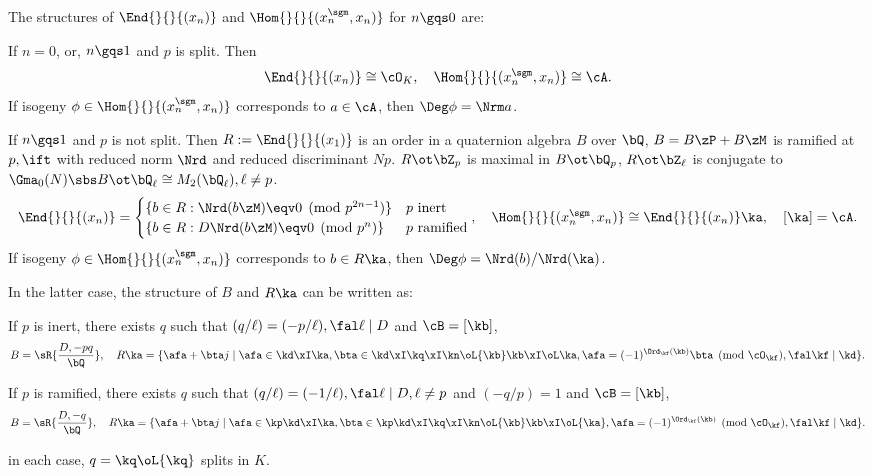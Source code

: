 \documentclass[article, a4paper, twoside]{universal}
\begin{document}
\begin{thm}\label{thm:structure}
	The structures of $\End{}{}{(x_{n})}$ and $\Hom{}{}{(x_{n}^{\sgm},x_{n})}$ for $n\gqs0$ are:
	\begin{itm}
		\item If $n=0$, or, $n\gqs1$ and $p$ is split. Then
		\[
			\End{}{}{(x_{n})}\cong\cO_{K},\quad \Hom{}{}{(x_{n}^{\sgm},x_{n})}\cong\cA.
		\]
		If isogeny $\phi\in\Hom{}{}{(x_{n}^{\sgm},x_{n})}$ corresponds to $a\in\cA$, then $\Deg\phi=\Nrm a$.
		\item If $n\gqs1$ and $p$ is not split. Then $R:=\End{}{}{(x_{1})}$ is an order in a quaternion algebra $B$ over $\bQ$, $B=B\zP+B\zM$ is ramified at $p,\ift$ with reduced norm $\Nrd$ and reduced discriminant $Np$. $R\ot\bZ_{p}$ is maximal in $B\ot\bQ_{p}$, $R\ot\bZ_{\ell}$ is conjugate to $\Gma_{0}(N)\sbs B\ot\bQ_{\ell}\cong M_{2}(\bQ_{\ell}),\ell\neq p$.
		\[
			\End{}{}{(x_{n})}=\begin{cases}
						\{b\in R:\Nrd(b\zM)\eqv0\pmod{p^{2n-1}}\} & \text{$p$ inert} \\
						\{b\in R:D\Nrd(b\zM)\eqv0\pmod{p^{n}}\} & \text{$p$ ramified} \\
						\end{cases},\quad \Hom{}{}{(x_{n}^{\sgm},x_{n})}\cong\End{}{}{(x_{n})}\ka,\quad [\ka]=\cA.
		\]
		If isogeny $\phi\in\Hom{}{}{(x_{n}^{\sgm},x_{n})}$ corresponds to $b\in R\ka$, then $\Deg\phi=\Nrd(b)/\Nrd(\ka)$.
	\end{itm}

	In the latter case, the structure of $B$ and $R\ka$ can be written as:
	\begin{itm}
		\item If $p$ is inert, there exists $q$ such that $(q/\ell)=(-p/\ell), \fal\ell \mid D$ and $\cB=[\kb]$,
		\[
			B=\sR{\frac{D,-pq}{\bQ}},\quad R\ka=\{\afa+\bta j\mid \afa\in\kd\xI\ka, \bta\in\kd\xI\kq\xI\kn\oL{\kb}\kb\xI\oL\ka, \afa=(-1)^{\Ord_{\kf}(\kb)}\bta\pmod{\cO_{\kf}},\fal\kf\mid \kd\}.
		\]
		\item If $p$ is ramified, there exists $q$ such that $(q/\ell)=(-1/\ell), \fal \ell\mid D,\ell\neq p$ and $(-q/p)=1$ and $\cB=[\kb]$,
		\[
			B=\sR{\frac{D,-q}{\bQ}},\quad R\ka=\{\afa+\bta j\mid \afa\in\kp\kd\xI\ka, \bta\in\kp\kd\xI\kq\xI\kn\oL{\kb}\kb\xI\oL{\ka}, \afa=(-1)^{\Ord_{\kf}(\kb)}\pmod{\cO_{\kf}},\fal\kf\mid \kd\}.
		\]
	\end{itm}
	in each case, $q=\kq\oL{\kq}$ splits in $K$.
\end{thm}
\end{document}
